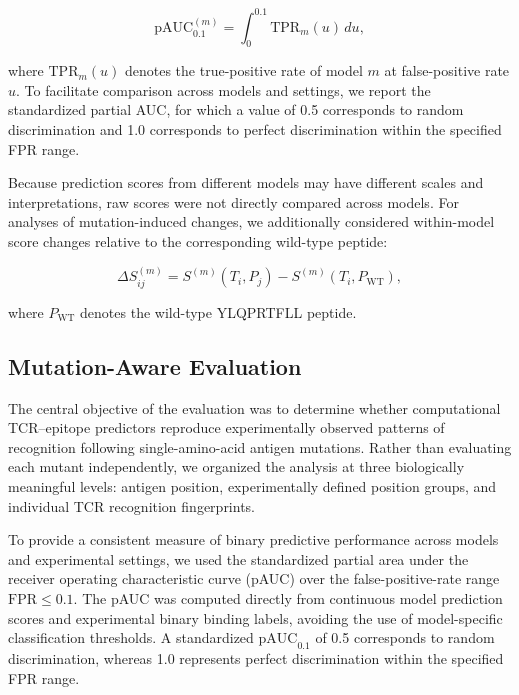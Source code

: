 \begin{equation}
\mathrm{pAUC}_{0.1}^{(m)}
=
\int_{0}^{0.1}
\mathrm{TPR}_m(u)\,du,
\label{eq:model_pauc}
\end{equation}

where $\mathrm{TPR}_m(u)$ denotes the true-positive rate of model $m$ at
false-positive rate $u$. To facilitate comparison across models and settings,
we report the standardized partial AUC, for which a value of 0.5 corresponds
to random discrimination and 1.0 corresponds to perfect discrimination
within the specified FPR range.

Because prediction scores from different models may have different scales
and interpretations, raw scores were not directly compared across models.
For analyses of mutation-induced changes, we additionally considered
within-model score changes relative to the corresponding wild-type peptide:

\begin{equation}
\Delta S_{ij}^{(m)}
=
S^{(m)}(T_i,P_j)
-
S^{(m)}(T_i,P_{\mathrm{WT}}),
\label{eq:model_delta}
\end{equation}

where $P_{\mathrm{WT}}$ denotes the wild-type YLQPRTFLL peptide.

\subsection{Mutation-Aware Evaluation}

The central objective of the evaluation was to determine whether computational
TCR--epitope predictors reproduce experimentally observed patterns of
recognition following single-amino-acid antigen mutations. Rather than
evaluating each mutant independently, we organized the analysis at three
biologically meaningful levels: antigen position, experimentally defined
position groups, and individual TCR recognition fingerprints.

To provide a consistent measure of binary predictive performance across
models and experimental settings, we used the standardized partial area under
the receiver operating characteristic curve (pAUC) over the false-positive-rate
range $\mathrm{FPR} \leq 0.1$. The pAUC was computed directly from continuous
model prediction scores and experimental binary binding labels, avoiding the
use of model-specific classification thresholds. A standardized
$\mathrm{pAUC}_{0.1}$ of 0.5 corresponds to random discrimination, whereas
1.0 represents perfect discrimination within the specified FPR range.


